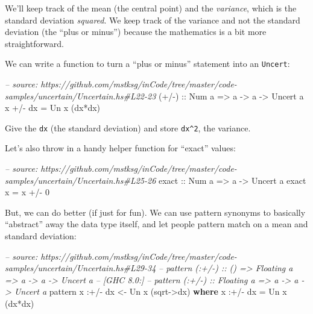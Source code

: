 \documentclass[]{article}
\newenvironment{Shaded}{}{}
\newcommand{\KeywordTok}[1]{\textcolor[rgb]{0.00,0.44,0.13}{\textbf{{#1}}}}
\newcommand{\DataTypeTok}[1]{\textcolor[rgb]{0.56,0.13,0.00}{{#1}}}
\newcommand{\DecValTok}[1]{\textcolor[rgb]{0.25,0.63,0.44}{{#1}}}
\newcommand{\CommentTok}[1]{\textcolor[rgb]{0.38,0.63,0.69}{\textit{{#1}}}}
\newcommand{\OtherTok}[1]{\textcolor[rgb]{0.00,0.44,0.13}{{#1}}}
\newcommand{\FunctionTok}[1]{\textcolor[rgb]{0.02,0.16,0.49}{{#1}}}
\newcommand{\NormalTok}[1]{{#1}}
\begin{document}
We'll keep track of the mean (the central point) and the \emph{variance}, which
is the standard deviation \emph{squared}. We keep track of the variance and not
the standard deviation (the ``plus or minus'') because the mathematics is a bit
more straightforward.

We can write a function to turn a ``plus or minus'' statement into an
\texttt{Uncert}:

\begin{Shaded}
\begin{Highlighting}[]
\CommentTok{-- source: https://github.com/mstksg/inCode/tree/master/code-samples/uncertain/Uncertain.hs#L22-23}
\OtherTok{(+/-) ::} \DataTypeTok{Num} \NormalTok{a }\OtherTok{=>} \NormalTok{a }\OtherTok{->} \NormalTok{a }\OtherTok{->} \DataTypeTok{Uncert} \NormalTok{a}
\NormalTok{x }\FunctionTok{+/-} \NormalTok{dx }\FunctionTok{=} \DataTypeTok{Un} \NormalTok{x (dx}\FunctionTok{*}\NormalTok{dx)}
\end{Highlighting}
\end{Shaded}

Give the \texttt{dx} (the standard deviation) and store \texttt{dx\^{}2}, the
variance.

Let's also throw in a handy helper function for ``exact'' values:

\begin{Shaded}
\begin{Highlighting}[]
\CommentTok{-- source: https://github.com/mstksg/inCode/tree/master/code-samples/uncertain/Uncertain.hs#L25-26}
\OtherTok{exact ::} \DataTypeTok{Num} \NormalTok{a }\OtherTok{=>} \NormalTok{a }\OtherTok{->} \DataTypeTok{Uncert} \NormalTok{a}
\NormalTok{exact x }\FunctionTok{=} \NormalTok{x }\FunctionTok{+/-} \DecValTok{0}
\end{Highlighting}
\end{Shaded}

But, we can do better (if just for fun). We can use pattern synonyms to
basically ``abstract'' away the data type itself, and let people pattern match
on a mean and standard deviation:

\begin{Shaded}
\begin{Highlighting}[]
\CommentTok{-- source: https://github.com/mstksg/inCode/tree/master/code-samples/uncertain/Uncertain.hs#L29-34}
\CommentTok{-- pattern (:+/-) :: () => Floating a => a -> a -> Uncert a}
\CommentTok{-- [GHC 8.0:]}
\CommentTok{-- pattern (:+/-) :: Floating a => a -> a -> Uncert a}
\NormalTok{pattern x }\FunctionTok{:+/-} \NormalTok{dx }\OtherTok{<-} \DataTypeTok{Un} \NormalTok{x (sqrt}\OtherTok{->}\NormalTok{dx)}
  \KeywordTok{where}
    \NormalTok{x }\FunctionTok{:+/-} \NormalTok{dx }\FunctionTok{=} \DataTypeTok{Un} \NormalTok{x (dx}\FunctionTok{*}\NormalTok{dx)}
\end{Highlighting}
\end{Shaded}
\end{document}
